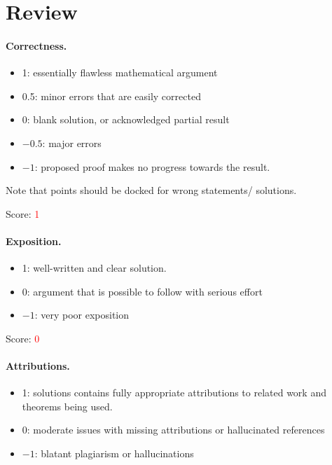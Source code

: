 \documentclass[11pt]{article}
\theoremstyle{definition}
\theoremstyle{remark}
\begin{document}
\maketitle

\section{Review}

\paragraph{Correctness.}
\begin{itemize}
	\item  1: essentially flawless mathematical argument
	\item  0.5: minor errors that are easily corrected
	\item  0: blank solution, or acknowledged partial result
	\item  $-0.5$: major errors
	\item  $-1$: proposed proof makes no progress towards the result.
\end{itemize}
Note that points should be docked for wrong statements/ solutions.

\noindent Score: \textcolor{red}{1}

\paragraph{Exposition.}
\begin{itemize}
	\item  1: well-written and clear solution.
	\item  0: argument that is possible to follow with serious effort
	\item  $-1$: very poor exposition
\end{itemize}

\noindent Score: \textcolor{red}{0}


\paragraph{Attributions.}
\begin{itemize}
	\item  1: solutions contains fully appropriate attributions
		to related work and theorems being used.
	\item  0: moderate issues with missing attributions or hallucinated references
	\item  $-1$: blatant plagiarism or hallucinations
\end{itemize}
\end{document}

